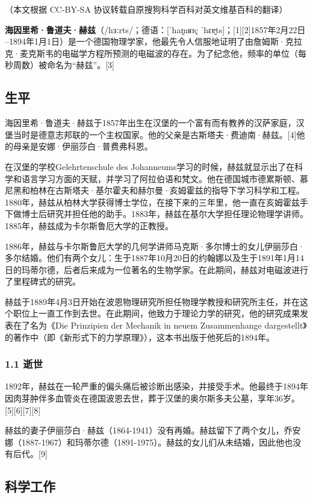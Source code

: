 
（本文根据 CC-BY-SA 协议转载自原搜狗科学百科对英文维基百科的翻译）

\textbf{海因里希·鲁道夫·赫兹}（/hɜːrts/；德语：[ˈhaɪ̯nʁɪç ˈhɛɐ̯ts]；[1][2]1857年2月22日 –1894年1月1日）是一个德国物理学家，他最先令人信服地证明了由詹姆斯·克拉克·麦克斯韦的电磁学方程所预测的电磁波的存在。为了纪念他，频率的单位（每秒周数）被命名为“赫兹”。[3]

\subsection{生平}
海因里希·鲁道夫·赫兹于1857年出生在汉堡的一个富有而有教养的汉萨家庭，汉堡当时是德意志邦联的一个主权国家。他的父亲是古斯塔夫·费迪南·赫兹。[4]他的母亲是安娜·伊丽莎白·普费弗科恩。

在汉堡的学校Gelehrtenschule des Johanneums学习的时候，赫兹就显示出了在科学和语言学习方面的天赋，并学习了阿拉伯语和梵文。他在德国城市德累斯顿、慕尼黑和柏林在古斯塔夫·基尔霍夫和赫尔曼·亥姆霍兹的指导下学习科学和工程。1880年，赫兹从柏林大学获得博士学位，在接下来的三年里，他一直在亥姆霍兹手下做博士后研究并担任他的助手。1883年，赫兹在基尔大学担任理论物理学讲师。1885年，赫兹成为卡尔斯鲁厄大学的正教授。

1886年，赫兹与卡尔斯鲁厄大学的几何学讲师马克斯·多尔博士的女儿伊丽莎白·多尔结婚。他们有两个女儿：生于1887年10月20日的约翰娜以及生于1891年1月14日的玛蒂尔德，后者后来成为一位著名的生物学家。在此期间，赫兹对电磁波进行了里程碑式的研究。

赫兹于1889年4月3日开始在波恩物理研究所担任物理学教授和研究所主任，并在这个职位上一直工作到去世。在此期间，他致力于理论力学的研究，他的研究成果发表在了名为《Die Prinzipien der Mechanik in neuem Zusammenhange dargestellt》的著作中（即《新形式下的力学原理》），这本书出版于他死后的1894年。

\subsubsection{1.1 逝世}
1892年，赫兹在一轮严重的偏头痛后被诊断出感染，并接受手术。他最终于1894年因肉芽肿伴多血管炎在德国波恩去世，葬于汉堡的奥尔斯多夫公墓，享年36岁。[5][6][7][8]

赫兹的妻子伊丽莎白·赫兹（1864-1941）没有再婚。赫兹留下了两个女儿，乔安娜（1887-1967）和玛蒂尔德（1891-1975）。赫兹的女儿们从未结婚，因此他也没有后代。[9]

\subsection{科学工作}
